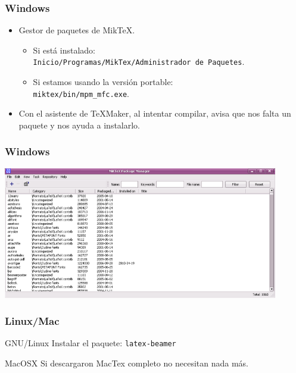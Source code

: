 \documentclass[aspectratio=43]{beamer}%
\begin{document}
\begin{frame}[fragile]
\frametitle{\textbf{Windows}}
\justifying
 \begin{itemize}\justifying
  \item Gestor de paquetes de Mik\TeX{}.
  \begin{itemize}\justifying
  \item Si está instalado:\\ \texttt{Inicio/Programas/MikTex/Administrador de Paquetes}.
  \item Si estamos usando la versión portable:\\ \texttt{miktex/bin/mpm\_mfc.exe}.
\end{itemize}

  \item Con el asistente de \TeX{}Maker, al intentar compilar, avisa que nos falta un paquete y nos ayuda a instalarlo.
\end{itemize}

\end{frame}
\begin{frame}[fragile]
\frametitle{\textbf{Windows}}
\justifying
 \begin{center}
\includegraphics[width=12cm]{images/miktexpackage}
\end{center}

\end{frame}

\begin{frame}[fragile]
\frametitle{\textbf{Linux/Mac}}
\justifying
 \begin{block}{GNU/Linux}
Instalar el paquete: \texttt{latex-beamer}
\end{block}
\begin{block}{MacOSX}
Si descargaron MacTex completo no necesitan nada más.
\end{block}

\end{frame}
\end{document}
